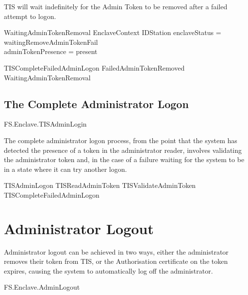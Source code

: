 TIS will wait indefinitely for the Admin Token to be removed after a
failed attempt to logon.

\begin{schema}{WaitingAdminTokenRemoval}
        EnclaveContext
\also
        \Xi IDStation
\where
        enclaveStatus = waitingRemoveAdminTokenFail
\\      adminTokenPresence = present     
\end{schema}

\begin{zed}
        TISCompleteFailedAdminLogon  FailedAdminTokenRemoved 
\lor WaitingAdminTokenRemoval
\end{zed}

\subsection{The Complete Administrator Logon}

\begin{traceunit}{FS.Enclave.TISAdminLogin}
\end{traceunit}

The complete administrator logon process, from the point that the
system has detected the presence of a token in the administrator
reader, involves 
validating the administrator token and, in the case of a failure 
waiting for the system to be in a state where it can try another logon.

\begin{zed}
        TISAdminLogon  TISReadAdminToken \lor TISValidateAdminToken \lor TISCompleteFailedAdminLogon
\end{zed}

\section{Administrator Logout}

Administrator logout can be achieved in two ways, either the
administrator removes their token from TIS, or the Authorisation
certificate on the token expires, causing the system to automatically
log off the administrator.

\begin{traceunit}{FS.Enclave.AdminLogout}
\end{traceunit}


